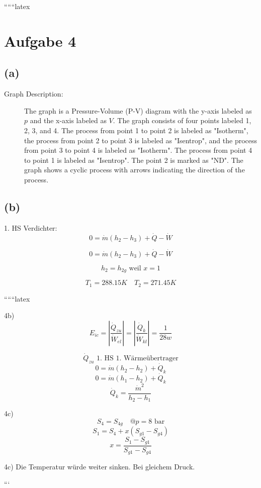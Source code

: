 
``````latex


\section*{Aufgabe 4}

\subsection*{(a)}

\begin{description}
    \item[Graph Description:] The graph is a Pressure-Volume (P-V) diagram with the y-axis labeled as $p$ and the x-axis labeled as $V$. The graph consists of four points labeled 1, 2, 3, and 4. The process from point 1 to point 2 is labeled as "Isotherm", the process from point 2 to point 3 is labeled as "Isentrop", and the process from point 3 to point 4 is labeled as "Isotherm". The process from point 4 to point 1 is labeled as "Isentrop". The point 2 is marked as "ND". The graph shows a cyclic process with arrows indicating the direction of the process.
\end{description}

\subsection*{(b)}

1. HS Verdichter:
\[
0 = \dot{m} (h_2 - h_3) + \dot{Q} - \dot{W}
\]

\[
0 = \dot{m} (h_2 - h_3) + \dot{Q} - \dot{W}
\]

\[
h_2 = h_{2g} \text{ weil } x = 1
\]

\[
T_1 = 288.15K \quad T_2 = 271.45K
\]

``````latex


4b) 
\[
E_{ic} = \left| \frac{\dot{Q}_{zu}}{\dot{W}_{el}} \right| = \left| \frac{\dot{Q}_{k}}{\dot{W}_{kl}} \right| = \frac{1}{28w}
\]

\[
\dot{Q}_{zu} \text{ 1. HS 1. Wärmeübertrager}
\]
\[
0 = \dot{m} (h_2 - h_2) + \dot{Q}_{k}
\]
\[
0 = \dot{m} (h_1 - h_2) + \dot{Q}_{k}
\]
\[
\dot{Q}_{k} = \frac{\dot{m}^2}{h_2 - h_1}
\]

4c) 
\[
S_{4} = S_{4g} \quad @ p = 8 \text{ bar}
\]
\[
S_{1} = S_{4} + x (S_{g1} - S_{g4})
\]
\[
x = \frac{S_{1} - S_{g1}}{S_{g1} - S_{g4}}
\]

4c) 
Die Temperatur würde weiter sinken. Bei gleichem Druck.

```